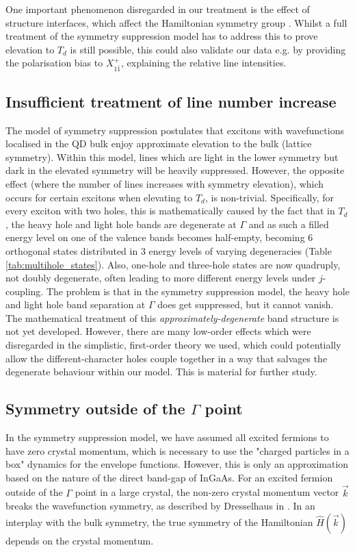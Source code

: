 One important phenomenon disregarded in our treatment is the effect of structure interfaces, which affect the Hamiltonian symmetry group \cite{interfaces}. Whilst a full treatment of the symmetry suppression model has to address this to prove elevation to $T_d$ is still possible, this could also validate our data e.g. by providing the polarisation bias to $X^+_{1\bar{1}}$, explaining the relative line intensities.

\subsection{Insufficient treatment of line number increase} \label{sec:failed_degeneracy}
The model of symmetry suppression postulates that excitons with wavefunctions localised in the QD bulk enjoy approximate elevation to the bulk (lattice symmetry). Within this model, lines which are light in the lower symmetry but dark in the elevated symmetry will be heavily suppressed. However, the opposite effect (where the number of lines increases with symmetry elevation), which occurs for certain excitons when elevating to $T_d$, is non-trivial. Specifically, for every exciton with two holes, this is mathematically caused by the fact that in $T_d$, the heavy hole and light hole bands are degenerate at $\Gamma$ and as such a filled energy level on one of the valence bands becomes half-empty, becoming $6$ orthogonal states distributed in $3$ energy levels of varying degeneracies (Table \ref{tab:multihole_states}). Also, one-hole and three-hole states are now quadruply, not doubly degenerate, often leading to more different energy levels under $j$-coupling. The problem is that in the symmetry suppression model, the heavy hole and light hole band separation at $\Gamma$ does get suppressed, but it cannot vanish. The mathematical treatment of this \textit{approximately-degenerate} band structure is not yet developed. However, there are many low-order effects which were disregarded in the simplistic, first-order theory we used, which could potentially allow the different-character holes couple together in a way that salvages the degenerate behaviour within our model. This is material for further study.

\subsection{Symmetry outside of the $\Gamma$ point}
In the symmetry suppression model, we have assumed all excited fermions to have zero crystal momentum, which is necessary to use the "charged particles in a box" dynamics for the envelope functions. However, this is only an approximation based on the nature of the direct band-gap of InGaAs. For an excited fermion outside of the $\Gamma$ point in a large crystal, the non-zero crystal momentum vector $\vec{k}$ breaks the wavefunction symmetry, as described by Dresselhaus in \cite[Ch. 13]{dresselhaus}. In an interplay with the bulk symmetry, the true symmetry of the Hamiltonian $\hat{H}\left(\vec{k}\right)$ depends on the crystal momentum. 

